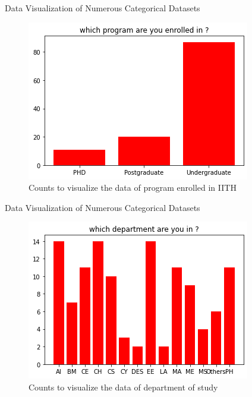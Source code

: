 \documentclass{beamer}
\begin{document}
\begin{frame}
\begin{block}{Data Visualization of Numerous Categorical Datasets}
\begin{figure}[hbtp]
\caption{Counts to visualize the data of program enrolled in IITH}
\centering
\includegraphics[scale=0.60]{program.png}
\end{figure}
\end{block}
\end{frame}

\begin{frame}
\begin{block}{Data Visualization of Numerous Categorical Datasets}
\begin{figure}[hbtp]
\caption{Counts to visualize the data of department of study}
\centering
\includegraphics[scale=0.60]{department.png}
\end{figure}
\end{block}
\end{frame}
\end{document}
